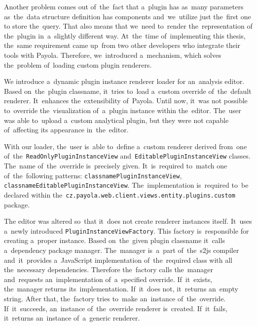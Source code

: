 Another problem comes out of~the~fact that a~plugin has as~many parameters as~the~data structure definition has components and~we~utilize just the~first one 
to store the~query. That also means that we~need to~render the~representation 
of the~plugin in~a~slightly different way. At~the~time of~implementing this 
thesis, the~same requirement came up~from two other developers who integrate their 
tools with Payola. Therefore, we~introduced a~mechanism, which solves the~problem of~loading custom plugin renderers.

We introduce a~dynamic plugin instance renderer loader for an~analysis editor. 
Based on~the~plugin classname, it~tries to~load a~custom override of~the~default 
renderer. It~enhances the~extensibility of~Payola. Until now, it~was not 
possible to~override the~visualization of~a~plugin instance within the~editor. The~user was able to~upload a~custom analytical plugin, but they were not capable of~affecting its
appearance in~the~editor.

\begin{sloppypar}
With our loader, the~user is~able to~define a~custom renderer derived from~one of~the~\texttt{ReadOnlyPluginInstanceView} and~\texttt{EditablePluginInstanceView} 
classes. The~name of~the~override is~precisely given. It~is~required to~match one 
of~the~following patterns: \texttt{{classname}PluginInstanceView},
\texttt{{classname}EditablePluginInstanceView}. The~implementation is~required
to~be declared within the~\texttt{cz.payola.web.client.views.entity.plugins.custom} package.
\end{sloppypar}

\begin{sloppypar}
The editor was altered so~that it~does not create renderer instances itself. It~uses a~newly introduced \texttt{PluginInstanceViewFactory}. This 
factory is~responsible for creating a~proper instance. Based on~the~given plugin 
classname it~calls a~dependency package manager. The~manager is~a~part of~the~s2js compiler and~it~provides a~JavaScript implementation of~the~required class
with all the~necessary dependencies. Therefore the~factory calls the~manager and~requests an~implementation of~a~specified override. If~it~exists, the~manager 
returns its~implementation. If~it~does not, it~returns an~empty string. After 
that, the~factory tries to~make an~instance of~the~override. If~it~succeeds, an~instance of~the~override renderer is~created. If~it~fails, it~returns an~instance of~a~generic renderer. 
\end{sloppypar}
 
